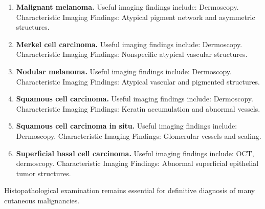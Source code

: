 \begin{enumerate}[leftmargin=*,itemsep=0.45em,topsep=0.4em]
\item \textbf{Malignant melanoma.} Useful imaging findings include: Dermoscopy. Characteristic Imaging Findings: Atypical pigment network and asymmetric structures.
\item \textbf{Merkel cell carcinoma.} Useful imaging findings include: Dermoscopy. Characteristic Imaging Findings: Nonspecific atypical vascular structures.
\item \textbf{Nodular melanoma.} Useful imaging findings include: Dermoscopy. Characteristic Imaging Findings: Atypical vascular and pigmented structures.
\item \textbf{Squamous cell carcinoma.} Useful imaging findings include: Dermoscopy. Characteristic Imaging Findings: Keratin accumulation and abnormal vessels.
\item \textbf{Squamous cell carcinoma in situ.} Useful imaging findings include: Dermoscopy. Characteristic Imaging Findings: Glomerular vessels and scaling.
\item \textbf{Superficial basal cell carcinoma.} Useful imaging findings include: OCT, dermoscopy. Characteristic Imaging Findings: Abnormal superficial epithelial tumor structures.
\end{enumerate}
Histopathological examination remains essential for definitive diagnosis of many cutaneous malignancies.

